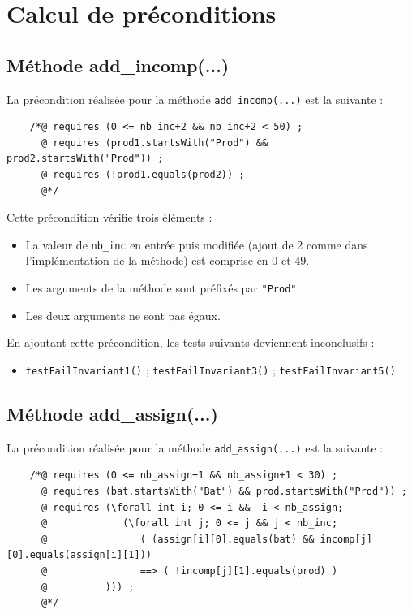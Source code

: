 \documentclass{article}
\begin{document}
\newpage

\section{Calcul de préconditions}

\subsection{Méthode add\_incomp(...)}

\noindent
La précondition réalisée pour la méthode \texttt{add\_incomp(...)} est la suivante :
\vspace{0.3cm}

\noindent
\begin{verbatim}
    /*@ requires (0 <= nb_inc+2 && nb_inc+2 < 50) ;
      @ requires (prod1.startsWith("Prod") && prod2.startsWith("Prod")) ; 
      @ requires (!prod1.equals(prod2)) ;
      @*/
\end{verbatim}

\noindent
Cette précondition vérifie trois éléments :
\begin{itemize}
\item La valeur de \texttt{nb\_inc} en entrée puis modifiée (ajout de 2 comme dans l'implémentation de la méthode) est comprise en 0 et 49.
\item Les arguments de la méthode sont préfixés par \texttt{"Prod"}.
\item Les deux arguments ne sont pas égaux.
\end{itemize}

\vspace{0.3cm}
\noindent
En ajoutant cette précondition, les tests suivants deviennent inconclusifs :
\begin{itemize}
\renewcommand{\labelitemi}{$\rightarrow$} 
\item \texttt{testFailInvariant1()} ; \texttt{testFailInvariant3()} ; \texttt{testFailInvariant5()}
\end{itemize}

\subsection{Méthode add\_assign(...)}

\noindent
La précondition réalisée pour la méthode \texttt{add\_assign(...)} est la suivante :
\vspace{0.3cm}

\noindent
\begin{verbatim}
    /*@ requires (0 <= nb_assign+1 && nb_assign+1 < 30) ;
      @ requires (bat.startsWith("Bat") && prod.startsWith("Prod")) ;
      @ requires (\forall int i; 0 <= i &&  i < nb_assign;
      @	            (\forall int j; 0 <= j && j < nb_inc;
      @	               ( (assign[i][0].equals(bat) && incomp[j][0].equals(assign[i][1]))
      @	               ==> ( !incomp[j][1].equals(prod) )
      @          ))) ;
      @*/
\end{verbatim}
\vspace{0.2cm}
\end{document}
